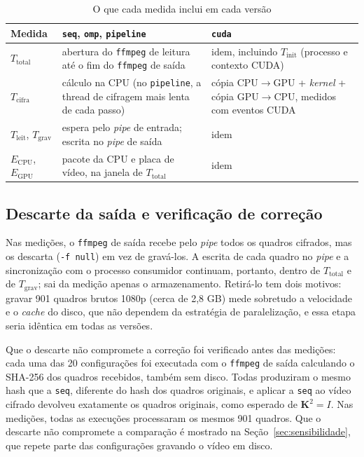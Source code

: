 \documentclass[12pt]{article}
\begin{document}
\begin{table}[ht]
\centering
\small
\caption{O que cada medida inclui em cada versão}
\label{tab:escopo}
\begin{tabular}{p{2.4cm}p{5.4cm}p{5.4cm}}
\hline
\textbf{Medida} & \textbf{\texttt{seq}, \texttt{omp}, \texttt{pipeline}} & \textbf{\texttt{cuda}} \\
\hline
$T_{\mathrm{total}}$ & abertura do \texttt{ffmpeg} de leitura até o fim do
\texttt{ffmpeg} de saída & idem, incluindo $T_{\mathrm{init}}$ (processo e
contexto CUDA) \\
$T_{\mathrm{cifra}}$ & cálculo na CPU (no \texttt{pipeline}, a thread de
cifragem mais lenta de cada passo) & cópia CPU$\to$GPU + \textit{kernel} +
cópia GPU$\to$CPU, medidos com eventos CUDA \\
$T_{\mathrm{leit}}$, $T_{\mathrm{grav}}$ & espera pelo \textit{pipe} de
entrada; escrita no \textit{pipe} de saída & idem \\
$E_{\mathrm{CPU}}$, $E_{\mathrm{GPU}}$ & pacote da CPU e placa de vídeo, na
janela de $T_{\mathrm{total}}$ & idem \\
\hline
\end{tabular}
\end{table}

\subsection{Descarte da saída e verificação de correção}
\label{sec:descarte}

Nas medições, o \texttt{ffmpeg} de saída recebe pelo \textit{pipe} todos os
quadros cifrados, mas os descarta (\texttt{-f null}) em vez de gravá-los. A
escrita de cada quadro no \textit{pipe} e a sincronização com o processo
consumidor continuam, portanto, dentro de $T_{\mathrm{total}}$ e de
$T_{\mathrm{grav}}$; sai da medição apenas o armazenamento. Retirá-lo tem dois
motivos: gravar 901 quadros brutos 1080p (cerca de 2,8 GB) mede sobretudo a
velocidade e o \textit{cache} do disco, que não dependem da estratégia de
paralelização, e essa etapa seria idêntica em todas as versões.

Que o descarte não compromete a correção foi verificado antes das medições:
cada uma das 20 configurações foi executada com o \texttt{ffmpeg} de saída
calculando o SHA-256 dos quadros recebidos, também sem disco. Todas produziram
o mesmo hash que a \texttt{seq}, diferente do hash dos quadros originais, e
aplicar a \texttt{seq} ao vídeo cifrado devolveu exatamente os quadros
originais, como esperado de $\mathbf{K}^2 = I$. Nas medições, todas as execuções
processaram os mesmos 901 quadros. Que o descarte não compromete a comparação é
mostrado na Seção~\ref{sec:sensibilidade}, que repete parte das configurações
gravando o vídeo em disco.
\end{document}
